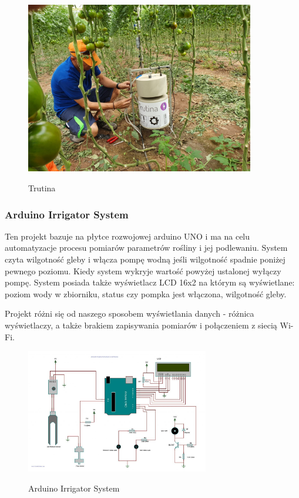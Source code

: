 \documentclass[12pt]{article}
\begin{document}
\begin{figure}[!h]
	\begin{center}
		{\includegraphics[width=10cm]{auto_water1.jpg}}
	\end{center}
	\caption{Trutina ~\cite{Trutina}}
\end{figure}


\newpage
\subsubsection{Arduino Irrigator System }

Ten projekt bazuje na płytce rozwojowej arduino UNO i ma na celu automatyzacje procesu pomiarów parametrów rośliny i jej podlewaniu. System czyta wilgotność gleby i włącza pompę wodną jeśli wilgotność spadnie poniżej pewnego poziomu. Kiedy system wykryje wartość powyżej ustalonej wyłączy pompę. System posiada także wyświetlacz LCD 16x2 na którym są wyświetlane: poziom wody w zbiorniku, status czy pompka jest włączona, wilgotność gleby.

Projekt różni się od naszego sposobem wyświetlania danych - różnica wyświetlaczy, a także brakiem zapisywania pomiarów i połączeniem z siecią Wi-Fi.



\begin{figure}[!h]
	\begin{center}
		{\includegraphics[width=8cm]{arduino_przyklad2.jpg}}
	\end{center}
	\caption{Arduino Irrigator System ~\cite{ArduinoIS}}
\end{figure}
\end{document}
